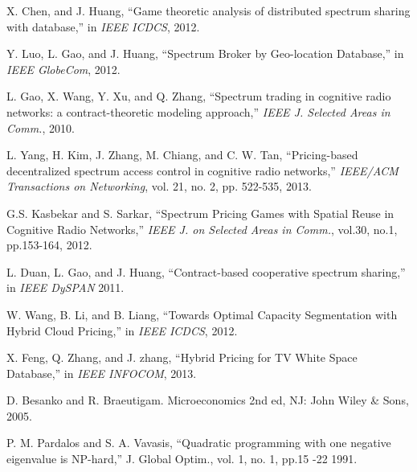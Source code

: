 \documentclass[journal]{IEEEtran}
\begin{document}
\begin{thebibliography}{1}
 X. Chen, and J. Huang, ``Game theoretic analysis of distributed
spectrum sharing with database,'' in \emph{IEEE ICDCS}, 2012.

 Y. Luo, L. Gao, and J. Huang, ``Spectrum Broker by Geo-location Database,'' in \emph{IEEE GlobeCom}, 2012.

 L. Gao, X. Wang, Y. Xu, and Q. Zhang, ``Spectrum trading in cognitive radio networks: a contract-theoretic modeling approach,'' \emph{IEEE J. Selected Areas in Comm.}, 2010.

 L. Yang, H. Kim, J. Zhang, M. Chiang, and C. W. Tan, ``Pricing-based decentralized spectrum access control in cognitive radio networks,'' \emph{IEEE/ACM Transactions on Networking},  vol. 21, no. 2, pp. 522-535, 2013.

 G.S. Kasbekar  and S. Sarkar, ``Spectrum Pricing Games with Spatial Reuse in Cognitive Radio Networks,'' \emph{IEEE J. on Selected Areas in Comm.}, vol.30, no.1, pp.153-164, 2012.

 L. Duan, L. Gao, and J. Huang, ``Contract-based cooperative spectrum sharing,'' in \emph{IEEE DySPAN} 2011.

 W. Wang, B. Li, and B. Liang, ``Towards Optimal Capacity Segmentation with Hybrid Cloud Pricing,'' in \emph{IEEE ICDCS}, 2012.

 X. Feng, Q. Zhang, and J. zhang, ``Hybrid Pricing for TV White Space Database,'' in \emph{IEEE INFOCOM}, 2013.

 D. Besanko and R. Braeutigam. Microeconomics 2nd ed, NJ: John Wiley \& Sons, 2005.

 P. M. Pardalos and S. A. Vavasis,  ``Quadratic programming with one negative eigenvalue is NP-hard,''  J. Global Optim.,  vol. 1,  no. 1,  pp.15 -22 1991.

\end{thebibliography}
\end{document}
